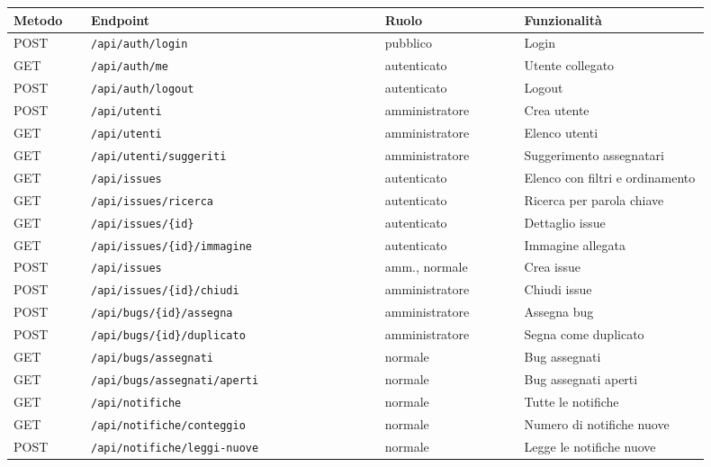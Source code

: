 \begin{center}
\renewcommand{\arraystretch}{1.4}
\begin{tabular}{|p{0.10\linewidth}|p{0.38\linewidth}|p{0.18\linewidth}|p{0.24\linewidth}|}
\hline
\textbf{Metodo} & \textbf{Endpoint} & \textbf{Ruolo} & \textbf{Funzionalità} \\
\hline
POST & \texttt{/api/auth/login} & pubblico & Login \\
GET & \texttt{/api/auth/me} & autenticato & Utente collegato \\
POST & \texttt{/api/auth/logout} & autenticato & Logout \\
\hline
POST & \texttt{/api/utenti} & amministratore & Crea utente \\
GET & \texttt{/api/utenti} & amministratore & Elenco utenti \\
GET & \texttt{/api/utenti/suggeriti} & amministratore & Suggerimento assegnatari \\
\hline
GET & \texttt{/api/issues} & autenticato & Elenco con filtri e ordinamento \\
GET & \texttt{/api/issues/ricerca} & autenticato & Ricerca per parola chiave \\
GET & \texttt{/api/issues/\{id\}} & autenticato & Dettaglio issue \\
GET & \texttt{/api/issues/\{id\}/immagine} & autenticato & Immagine allegata \\
POST & \texttt{/api/issues} & amm., normale & Crea issue \\
POST & \texttt{/api/issues/\{id\}/chiudi} & amministratore & Chiudi issue \\
\hline
POST & \texttt{/api/bugs/\{id\}/assegna} & amministratore & Assegna bug \\
POST & \texttt{/api/bugs/\{id\}/duplicato} & amministratore & Segna come duplicato \\
GET & \texttt{/api/bugs/assegnati} & normale & Bug assegnati \\
GET & \texttt{/api/bugs/assegnati/aperti} & normale & Bug assegnati aperti \\
\hline
GET & \texttt{/api/notifiche} & normale & Tutte le notifiche \\
GET & \texttt{/api/notifiche/conteggio} & normale & Numero di notifiche nuove \\
POST & \texttt{/api/notifiche/leggi-nuove} & normale & Legge le notifiche nuove \\
\hline
\end{tabular}
\end{center}
